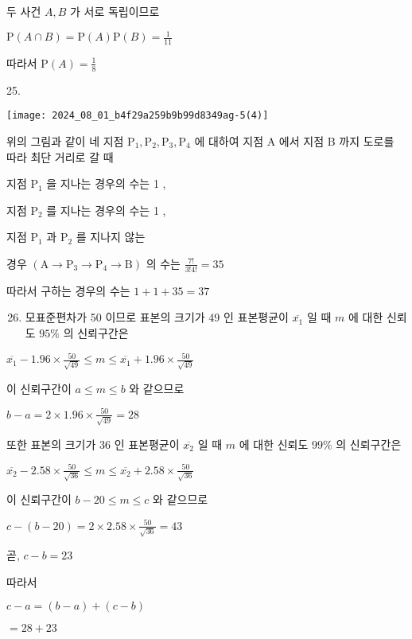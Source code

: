 \documentclass[10pt]{article}
\begin{document}
두 사건 $A, B$ 가 서로 독립이므로

$\mathrm{P}(A \cap B)=\mathrm{P}(A) \mathrm{P}(B)=\frac{1}{11}$

따라서 $\mathrm{P}(A)=\frac{1}{8}$

25.

\begin{center}
\texttt{[image: 2024\_08\_01\_b4f29a259b9b99d8349ag-5(4)]}
\end{center}

위의 그림과 같이 네 지점 $\mathrm{P}_{1}, \mathrm{P}_{2}, \mathrm{P}_{3}, \mathrm{P}_{4}$ 에 대하여 지점 A 에서 지점 B 까지 도로를 따라 최단 거리로 갈 때

지점 $\mathrm{P}_{1}$ 을 지나는 경우의 수는 1 ,

지점 $\mathrm{P}_{2}$ 를 지나는 경우의 수는 1 ,

지점 $\mathrm{P}_{1}$ 과 $\mathrm{P}_{2}$ 를 지나지 않는

경우 $\left(\mathrm{A} \rightarrow \mathrm{P}_{3} \rightarrow \mathrm{P}_{4} \rightarrow \mathrm{B}\right)$ 의 수는 $\frac{7!}{3!4!}=35$

따라서 구하는 경우의 수는 $1+1+35=37$

\begin{enumerate}
  \setcounter{enumi}{25}
  \item 모표준편차가 50 이므로 표본의 크기가 49 인 표본평균이 $\overline{x_{1}}$ 일 때 $m$ 에 대한 신뢰도 $95 \%$ 의 신뢰구간은
\end{enumerate}

$\overline{x_{1}}-1.96 \times \frac{50}{\sqrt{49}} \leq m \leq \overline{x_{1}}+1.96 \times \frac{50}{\sqrt{49}}$

이 신뢰구간이 $a \leq m \leq b$ 와 같으므로

$b-a=2 \times 1.96 \times \frac{50}{\sqrt{49}}=28$

또한 표본의 크기가 36 인 표본평균이 $\overline{x_{2}}$ 일 때 $m$ 에 대한 신뢰도 $99 \%$ 의 신뢰구간은

$\overline{x_{2}}-2.58 \times \frac{50}{\sqrt{36}} \leq m \leq \overline{x_{2}}+2.58 \times \frac{50}{\sqrt{36}}$

이 신뢰구간이 $b-20 \leq m \leq c$ 와 같으므로

$c-(b-20)=2 \times 2.58 \times \frac{50}{\sqrt{36}}=43$

곧, $c-b=23$

따라서

$c-a=(b-a)+(c-b)$

$=28+23$
\end{document}
